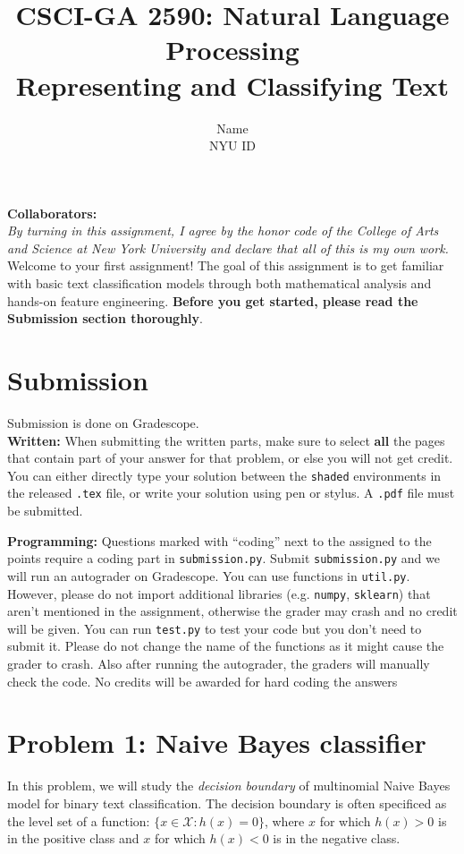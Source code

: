 \documentclass{article}
\title{\textbf{CSCI-GA 2590: Natural Language Processing} \\Representing and Classifying Text}
\author{Name \\
NYU ID}
\date{}
\theoremstyle{case}
\theoremstyle{definition}
\begin{document}
\maketitle

\textbf{Collaborators:} \\
\textit{By turning in this assignment, I agree by the honor code of the College of Arts and Science at New York University and declare
that all of this is my own work.} \\

Welcome to your first assignment! The goal of this assignment is to get familiar with basic text classification models through both mathematical analysis and hands-on feature engineering.
\textbf{Before you get started, please read the Submission section thoroughly}.

\section*{Submission}
Submission is done on Gradescope. \\

\textbf{Written:} When submitting the written parts, make sure to select \textbf{all} the pages that contain part of your answer for that problem, or else you will not get credit.
You can either directly type your solution between the \texttt{shaded} environments in the released \texttt{.tex} file,
or write your solution using pen or stylus. 
A \texttt{.pdf} file must be submitted.

\textbf{Programming:} Questions marked with ``coding'' next to the assigned to the points require a coding part in \texttt{submission.py}.
Submit \texttt{submission.py} and we will run an autograder on Gradescope. You can use functions in \texttt{util.py}. However, please do not import additional libraries (e.g. \texttt{numpy}, \texttt{sklearn}) that aren't mentioned in the assignment, otherwise the grader may crash and no credit will be given.
You can run \texttt{test.py} to test your code but you don't need to submit it. Please do not change the name of the functions as it might cause the grader to crash. Also after running the autograder, the graders will manually check the code. No credits will be awarded for hard coding the answers


\section*{Problem 1: Naive Bayes classifier}
In this problem, we will study the \emph{decision boundary} of multinomial Naive Bayes model for binary text classification.
The decision boundary is often specificed as the level set of a function:
$\{x\in\mathcal{X} : h(x) = 0\}$,
where $x$ for which $h(x) > 0$ is in the positive class and
$x$ for which $h(x) < 0$ is in the negative class.
\end{document}
